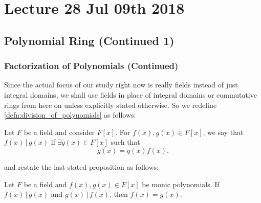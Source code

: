 \chapter{Lecture 28 Jul 09th 2018}%
\label{chp:lecture_28_jul_09th_2018}

\section{Polynomial Ring (Continued 1)}%
\label{sec:polynomial_ring_continued_1}

\subsection{Factorization of Polynomials (Continued)}%
\label{sub:factorization_of_polynomials_continued}

Since the actual focus of our study right now is really fields instead of just integral domains, we shall use fields in place of integral domains or commutative rings from here on unless explicitly stated otherwise. So we redefine \cref{defn:division_of_polynomials} as follows:

\begin{defnnonum}
  Let $F$ be a field and consider $F[x]$. For $f(x), g(x) \in F[x]$, we say that $f(x) \, | \, g(x)$ if $\exists q(x) \in F[x]$ such that
  \begin{equation*}
    g(x) = q(x) f(x).
  \end{equation*}
\end{defnnonum}

and restate the last stated proposition as follows:

\begin{propo}[$f(x) \, | \, g(x) \, \land \, g(x) \, | \, f(x) \implies f(x) = g(x)$]
\label{propo:f_div_g_and_g_div_f_implies_f_is_g}
Let $F$ be a field and $f(x), g(x) \in F[x]$ be monic polynomials. If $f(x) \, | \, g(x)$ and $g(x) \, | \, f(x)$, then $f(x) = g(x)$.
\end{propo}

